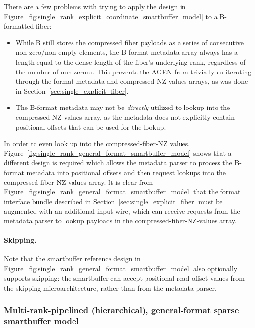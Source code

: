 There are a few problems with trying to apply the design in Figure~\ref{fig:single_rank_explicit_coordinate_smartbuffer_model} to a B-formatted fiber:

\begin{itemize}
    \item While B still stores the compressed fiber payloads as a series of consecutive non-zero/non-empty elements, the B-format metadata array always has a length equal to the dense length of the fiber's underlying rank, regardless of the number of non-zeroes. This prevents the AGEN from trivially co-iterating through the format-metadata and compressed-NZ-values arrays, as was done in Section~\ref{sec:single_explicit_fiber}.
    \item The B-format metadata may not be \textit{directly} utilized to lookup into the compressed-NZ-values array, as the metadata does not explicitly contain positional offsets that can be used for the lookup. 
\end{itemize}

In order to even look up into the compressed-fiber-NZ values, Figure~\ref{fig:single_rank_general_format_smartbuffer_model} shows that a different design is required which allows the metadata parser to process the B-format metadata into positional offsets and then request lookups into the compressed-fiber-NZ-values array. It is clear from Figure~\ref{fig:single_rank_general_format_smartbuffer_model} that the format interface bundle described in Section~\ref{sec:single_explicit_fiber} must be augmented with an additional input wire, which can receive requests from the metadata parser to lookup payloads in the compressed-fiber-NZ-values array.

\paragraph{Skipping.} Note that the smartbuffer reference design in Figure~\ref{fig:single_rank_general_format_smartbuffer_model} also optionally supports skipping: the smartbuffer can accept positional read offset values from the skipping microarchitecture, rather than from the metadata parser.

\subsubsection{Multi-rank-pipelined (hierarchical), general-format sparse smartbuffer model}

